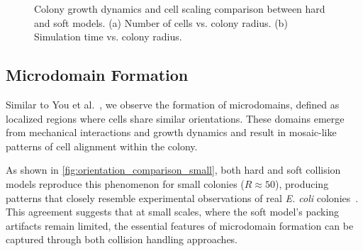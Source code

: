 \documentclass[conference]{IEEEtran}
\begin{document}
\begin{figure}[h]
    \caption{Colony growth dynamics and cell scaling comparison between hard and soft models. (a) Number of cells vs. colony radius. (b) Simulation time vs. colony radius.}
    \label{fig:comparison_combined}
\end{figure}

\subsection{Microdomain Formation}
\label{sec:microdomain_formation}

Similar to You et al.~\cite{You2018,You_2021}, we observe the formation of microdomains, defined as localized regions where cells share similar orientations. These domains emerge from mechanical interactions and growth dynamics and result in mosaic-like patterns of cell alignment within the colony.

As shown in \autoref{fig:orientation_comparison_small}, both hard and soft collision models reproduce this phenomenon for small colonies ($R \approx 50$), producing patterns that closely resemble experimental observations of real \textit{E. coli} colonies~\cite{You2018}. This agreement suggests that at small scales, where the soft model's packing artifacts remain limited, the essential features of microdomain formation can be captured through both collision handling approaches.
\end{document}
